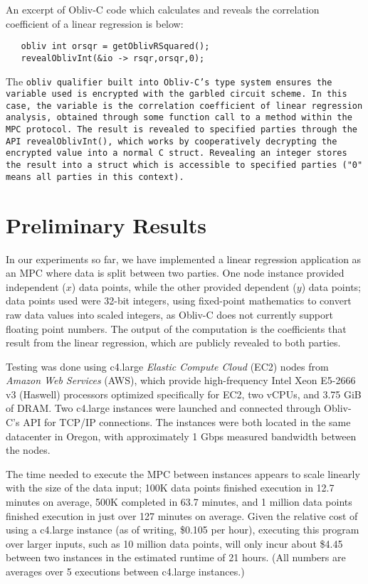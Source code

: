 \documentclass[conference]{IEEEtran}
\begin{document}
An excerpt of Obliv-C code which calculates and reveals the correlation
coefficient of a linear regression is below:

\begin{verbatim}
   obliv int orsqr = getOblivRSquared();
   revealOblivInt(&io -> rsqr,orsqr,0);
\end{verbatim}
\noindent
The \tt{obliv} qualifier built into Obliv-C's type system ensures the
variable used is encrypted with the garbled circuit
scheme\cite{cryptoeprint:2015:1153}. In this case, the variable is the
correlation coefficient of linear regression analysis, obtained through
some function call to a method within the MPC protocol. The result is
revealed to specified parties through the API \tt{revealOblivInt()},
which works by cooperatively decrypting the encrypted value into a
normal C struct.  Revealing an integer stores the result into a struct
which is accessible to specified parties ("0" means all parties in this
context).

\section{Preliminary Results}

In our experiments so far, we have implemented a linear regression
application as an MPC where data is split between two parties.  One node
instance provided independent ($x$) data points, while the other
provided dependent ($y$) data points; data points used were 32-bit
integers, using fixed-point mathematics to convert raw data values into
scaled integers, as Obliv-C does not currently support floating point
numbers.  The output of the computation is the coefficients that result
from the linear regression, which are publicly revealed to both parties.

Testing was done using c4.large \emph{Elastic Compute Cloud} (EC2) nodes
from \emph{Amazon Web Services} (AWS)\cite{aws:ec2}, which provide
high-frequency Intel Xeon E5-2666 v3 (Haswell) processors optimized
specifically for EC2, two vCPUs, and 3.75 GiB of DRAM.  Two c4.large
instances were launched and connected through Obliv-C's API for TCP/IP
connections. The instances were both located in the same datacenter in
Oregon, with approximately 1 Gbps measured bandwidth between the
nodes. 

The time needed to execute the MPC between instances appears to scale
linearly with the size of the data input; 100K data points finished
execution in 12.7 minutes on average, 500K completed in 63.7 minutes,
and 1 million data points finished execution in just over 127 minutes on
average. Given the relative cost of using a c4.large instance (as of
writing, \$0.105 per hour), executing this program over larger inputs,
such as 10 million data points, will only incur about \$4.45 between two
instances in the estimated runtime of 21 hours.  (All numbers are
averages over 5 executions between c4.large instances.)
\end{document}
